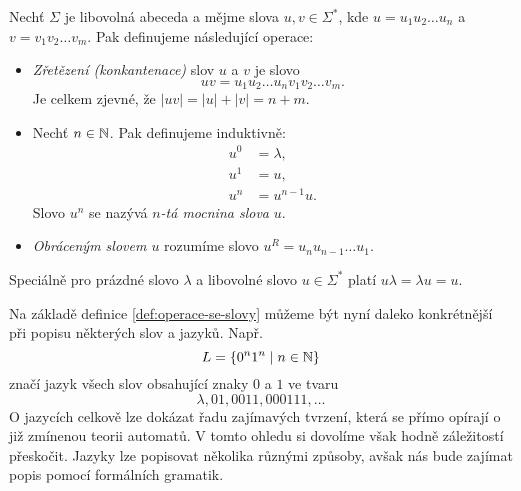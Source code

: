 \begin{definition}\label{def:operace-se-slovy}
    Nechť $\Sigma$ je libovolná abeceda a mějme slova $u,v\in\Sigma^*$, kde $u=u_1u_2\ldots u_n$ a $v=v_1v_2\ldots v_m$. Pak definujeme následující operace:
    \begin{itemize}
        \item \emph{Zřetězení (konkantenace)} slov $u$ a $v$ je slovo
        \[uv=u_1u_2\ldots u_nv_1v_2\ldots v_m.\]
        Je celkem zjevné, že $|uv|=|u|+|v|=n+m$.
        \item Nechť $n\in\mathbb{N}$. Pak definujeme induktivně:
        \begin{align*}
            u^0&=\lambda,\\
            u^1&=u,\\
            u^n&=u^{n-1}u.
        \end{align*}
        Slovo $u^n$ se nazývá \emph{$n$-tá mocnina slova} $u$.
        \item \emph{Obráceným slovem $u$} rozumíme slovo $u^R=u_nu_{n-1}\ldots u_1$.
    \end{itemize}
\end{definition}
\begin{remark}
    Speciálně pro prázdné slovo $\lambda$ a libovolné slovo $u\in\Sigma^*$ platí $u\lambda=\lambda u=u$.
\end{remark}
Na základě definice \ref{def:operace-se-slovy} můžeme být nyní daleko konkrétnější při popisu některých slov a jazyků. Např.
\[L=\left\{0^n1^n\mid n\in\mathbb{N}\right\}\]
značí jazyk všech slov obsahující znaky $0$ a $1$ ve tvaru
\[\lambda,01,0011,000111,\ldots\]
O jazycích celkově lze dokázat řadu zajímavých tvrzení, která se přímo opírají o již zmínenou teorii automatů. V tomto ohledu si dovolíme však hodně záležitostí přeskočit. Jazyky lze popisovat několika různými způsoby, avšak nás bude zajímat popis pomocí formálních gramatik.
